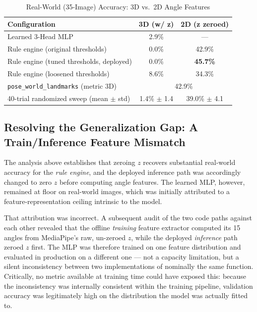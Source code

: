 \documentclass[conference]{IEEEtran}
\begin{document}
\begin{table}[!t]
\centering
\caption{Real-World (35-Image) Accuracy: 3D vs.\ 2D Angle Features}
\label{tab:depthablation}
\begin{tabular}{@{}lcc@{}}
\toprule
\textbf{Configuration} & \textbf{3D (w/ z)} & \textbf{2D (z zeroed)} \\
\midrule
Learned 3-Head MLP & 2.9\% & --- \\
Rule engine (original thresholds) & 0.0\% & 42.9\% \\
Rule engine (tuned thresholds, deployed) & 0.0\% & \textbf{45.7\%} \\
Rule engine (loosened thresholds) & 8.6\% & 34.3\% \\
\texttt{pose\_world\_landmarks} (metric 3D) & \multicolumn{2}{c}{42.9\%} \\
\midrule
40-trial randomized sweep (mean $\pm$ std) & 1.4\% $\pm$ 1.4 & 39.0\% $\pm$ 4.1 \\
\bottomrule
\end{tabular}
\end{table}

\subsection{Resolving the Generalization Gap: A Train/Inference Feature Mismatch}
\label{sec:zerozfix}

The analysis above establishes that zeroing $z$ recovers substantial real-world
accuracy for the \emph{rule engine}, and the deployed inference path was
accordingly changed to zero $z$ before computing angle features. The learned
MLP, however, remained at floor on real-world images, which was initially
attributed to a feature-representation ceiling intrinsic to the model.

That attribution was incorrect. A subsequent audit of the two code paths
against each other revealed that the offline \emph{training} feature extractor
computed its 15 angles from MediaPipe's raw, un-zeroed $z$, while the deployed
\emph{inference} path zeroed $z$ first. The MLP was therefore trained on one
feature distribution and evaluated in production on a different one --- not a
capacity limitation, but a silent inconsistency between two implementations of
nominally the same function. Critically, no metric available at training time
could have exposed this: because the inconsistency was internally consistent
within the training pipeline, validation accuracy was legitimately high on the
distribution the model was actually fitted to.
\end{document}

